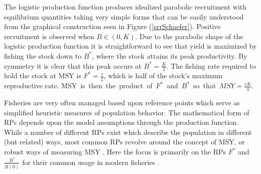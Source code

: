 \documentclass[12pt]{article}
\begin{document}
%
The logistic production function produces idealized parabolic recruitment with 
equilibrium quantities taking very simple forms that can be easily understood from the 
graphical construction seen in Figure (\ref{srrSchaefer}). Positive 
recruitment is observed when \mbox{$B\in(0, K)$.} Due to the parabolic shape of the 
logistic production function it is straightforward to see that yield is maximized 
by fishing the stock down to $B^*$, where the stock attains its peak productivity. 
By symmetry it is clear that this peak occurs at $B^*=\frac{K}{2}$. The fishing 
rate required to hold the stock at MSY is $F^*=\frac{r}{2}$, which is half of the 
stock's maximum reproductive rate. \mbox{MSY is then the product of $F^*$ and $B^*$ 
so that $MSY=\frac{rK}{4}$.}


Fisheries are very often managed based upon reference points which serve as 
simplified heuristic measures of population behavior. The mathematical form of 
RPs depends upon the model assumptions through the production function. %
While a number of different RPs exist which describe the population in different 
(but related) ways, most common RPs revolve around the concept of MSY, or robust 
ways of measuring MSY .
Here the focus is primarily on the RPs $F^*$ and $\frac{B^*}{\bar B(0)}$ for their 
common usage in modern fisheries .

\end{document}
